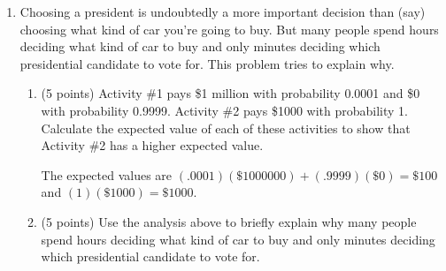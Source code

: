 \documentclass[twoside]{article}
\begin{document}
\begin{enumerate}
\begin{enumerate}
\begin{KEY}
Drivers who move out of slow lanes and into fast lanes slow down the fast lanes and speed up the slow lanes, thereby equalizing traffic speed in the different lanes.
\end{KEY}

    \item \begin{EXAM} (5 points) Many economists believe that a similar logic holds when it comes to making investments for, say, a retirement fund. Describe their investment advice, or otherwise explain.  \end{EXAM}

\begin{KEY}
These economists argue that ``you can't beat the market" (formally, this is called the efficient market hypothesis) and therefore that you should invest in an index fund that buys a little bit of everything. The idea here is that this sort of passively managed fund will have lower management costs than an actively managed fund that tries to beat the market.
\end{KEY}

    \end{enumerate}



\item \begin{EXAM} Choosing a president is undoubtedly a more important decision than (say) choosing what kind of car you're going to buy. But many people spend hours deciding what kind of car to buy and only minutes deciding which presidential candidate to vote for. This problem tries to explain why. \end{EXAM}

    \begin{enumerate}

    \item \begin{EXAM} (5 points) Activity \#1 pays \$1 million with probability 0.0001 and \$0 with probability 0.9999. Activity \#2 pays \$1000 with probability 1. Calculate the expected value of each of these activities to show that Activity \#2 has a higher expected value.  \end{EXAM}

\begin{KEY}
The expected values are $(.0001)(\$1000000)+(.9999)(\$0) = \$100$ and $(1)(\$1000)=\$1000$.
\end{KEY}

    \item \begin{EXAM} (5 points) Use the analysis above to briefly explain why many people spend hours deciding what kind of car to buy and only minutes deciding which presidential candidate to vote for. \end{EXAM}


\end{enumerate}
\end{enumerate}
\end{document}
